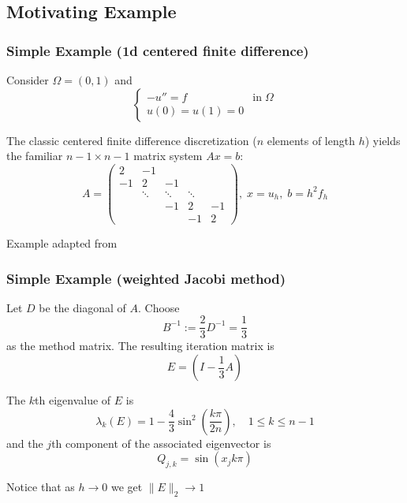 \documentclass[xcolor=dvipsnames]{beamer}
\begin{document}
\subsection{Motivating Example}
\begin{frame}
  \frametitle{Simple Example (1d centered finite difference)}
  Consider $\Omega = (0,1)$ and 
  $$\begin{cases}
    -u'' = f & \text{in}\; \Omega\\ 
    u(0) = u(1) = 0
  \end{cases}$$

  The classic centered finite difference discretization ($n$ elements of length $h$) 
  yields the familiar $n-1 \times n-1$ matrix system $Ax=b$:
  \[
A = \begin{pmatrix}
2      & -1     &        &        &                \\
-1     & 2      & -1     &        &                \\
       & \ddots & \ddots & \ddots &               \\
        &        & -1     & 2      & -1    \\
        &        &        & -1     & 2      
\end{pmatrix},\; x=u_h,\; b = h^2 f_h
\]

  \small{Example adapted from \cite{mg-tutorial}}
\end{frame}

\begin{frame}
  \frametitle{Simple Example (weighted Jacobi method)}
  Let $D$ be the diagonal of $A$. Choose 
  $$B^{-1} := \frac{2}{3} D^{-1} = \frac{1}{3}$$ 
  as the method matrix. 
  The resulting iteration matrix is
  $$E = \left(I - \frac{1}{3}A\right)$$

  The $k$th eigenvalue of $E$ is
  $$\lambda_k(E) = 1 - \frac{4}{3} \sin^2 \left(\frac{k \pi}{2 n} \right), \quad 1 \leq k \leq n-1$$
  and the $j$th component of the associated eigenvector is 
  $$Q_{j,k} = \sin (x_j k \pi)$$

  Notice that as $h \to 0$ we get $\|E\|_2 \to 1$
\end{frame}
\end{document}
